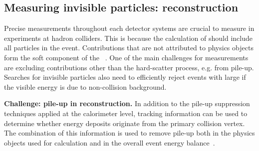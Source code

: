 \begin{textbox}[!h]
\section{Measuring invisible particles: \MET reconstruction}

Precise measurements throughout each detector systems are crucial to measure \MET in experiments at hadron colliders. This is because the calculation of \vec{\MET} should include all particles in the event.
Contributions that are not attributed to physics objects form the soft component of the \MET~\cite{Aad:2016nrq,CMS-PAS-JME-16-004}. 
One of the main challenges for \MET measurements are excluding contributions other than the hard-scatter process, e.g. from pile-up. 
Searches for invisible particles also need to efficiently reject events with large \MET if the visible energy is due to non-collision background. 

\textbf{Challenge: pile-up in \MET reconstruction.} 
In addition to the pile-up suppression techniques applied at the calorimeter level, tracking information can be used to determine whether energy deposits originate from the primary collision vertex. 
The combination of this information is used to remove pile-up both in the physics objects used for \MET calculation and in the overall event energy balance~\cite{CMS-PAS-JME-16-004,ATLAS-CONF-2014-019}. 



\end{textbox}
